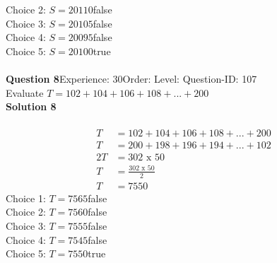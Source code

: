 \documentclass{article}
\begin{document}
Choice 2: \hspace{20pt}$S=20110$\hspace{20pt}false\\
Choice 3: \hspace{20pt}$S=20105$\hspace{20pt}false\\
Choice 4: \hspace{20pt}$S=20095$\hspace{20pt}false\\
Choice 5: \hspace{20pt}$S=20100$\hspace{20pt}true\\
\\[4pt]
\noindent\textbf{Question 8}\hspace{20pt}Experience: 30\hspace{20pt}Order: \hspace{20pt}Level: \hspace{20pt}Question-ID: 107\\[2pt]
Evaluate $T=102+104+106+108+...+200$\\[4pt]
\noindent\textbf{Solution 8}\\[2pt]
\\[-35pt]\begin{align*}
T&=102+104+106+108+...+200\\[2pt]
T&=200+198+196+194+...+102\\[2pt]
2T&=302\,\,\text{x}\,\,50\\[2pt]
T&=\displaystyle\frac{302\,\,\text{x}\,\,50}{2}\\[2pt]
T&=7550
\end{align*}
Choice 1: \hspace{20pt}$T=7565$\hspace{20pt}false\\
Choice 2: \hspace{20pt}$T=7560$\hspace{20pt}false\\
Choice 3: \hspace{20pt}$T=7555$\hspace{20pt}false\\
Choice 4: \hspace{20pt}$T=7545$\hspace{20pt}false\\
Choice 5: \hspace{20pt}$T=7550$\hspace{20pt}true\\
\\[4pt]
\end{document}
